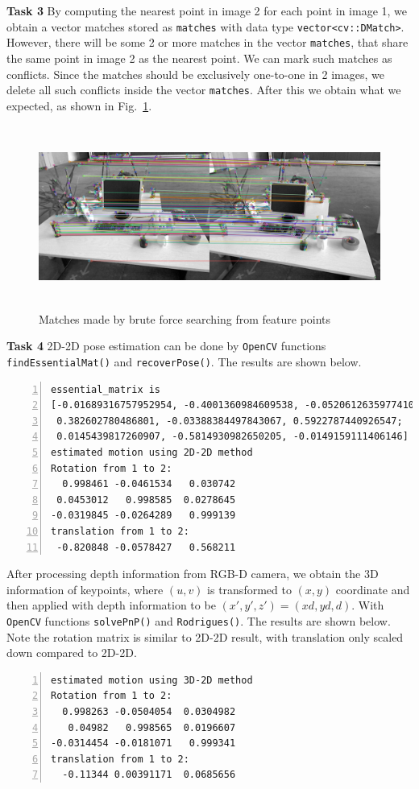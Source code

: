 \documentclass[12pt,a4paper]{article}
\begin{document}
    \textsf{\textbf{Task 3}}
    By computing the nearest point in image 2 for each point in image 1,
    we obtain a vector matches stored as \texttt{matches}
    with data type \texttt{vector<cv::DMatch>}.
    However, there will be some 2 or more matches in the vector \texttt{matches},
    that share the same point in image 2 as the nearest point.
    We can mark such matches as conflicts.
    Since the matches should be exclusively one-to-one in 2 images,
    we delete all such conflicts inside the vector \texttt{matches}.
    After this we obtain what we expected, as shown in Fig.~\ref{fig:matches}.
    
    \begin{figure}[!h]
        \centering
        \includegraphics[height=6cm]{fig/matches.png}
        \caption{Matches made by brute force searching from feature points}
        \label{fig:matches}
    \end{figure}

    \textsf{\textbf{Task 4}}
    2D-2D pose estimation can be done by \texttt{OpenCV} functions
    \texttt{findEssentialMat()} and \texttt{recoverPose()}.
    The results are shown below.
    \begin{lstlisting}[frame=single,numbers=left]
essential_matrix is 
[-0.01689316757952954, -0.4001360984609538, -0.05206126359774105;
 0.382602780486801, -0.03388384497843067, 0.5922787440926547;
 0.0145439817260907, -0.5814930982650205, -0.0149159111406146]
estimated motion using 2D-2D method
Rotation from 1 to 2: 
  0.998461 -0.0461534   0.030742
 0.0453012   0.998585  0.0278645
-0.0319845 -0.0264289   0.999139
translation from 1 to 2: 
 -0.820848 -0.0578427   0.568211
    \end{lstlisting}

    After processing depth information from RGB-D camera,
    we obtain the 3D information of keypoints,
    where $(u,v)$ is transformed to $(x,y)$ coordinate
    and then applied with depth information to be
    $(x',y',z') = (xd, yd, d)$.
    With \texttt{OpenCV} functions
    \texttt{solvePnP()} and \texttt{Rodrigues()}.
    The results are shown below.
    Note the rotation matrix is similar to 2D-2D result,
    with translation only scaled down compared to 2D-2D.
    \begin{lstlisting}[frame=single,numbers=left]
estimated motion using 3D-2D method
Rotation from 1 to 2: 
  0.998263 -0.0504054  0.0304982
   0.04982   0.998565  0.0196607
-0.0314454 -0.0181071   0.999341
translation from 1 to 2: 
  -0.11344 0.00391171  0.0685656
    \end{lstlisting}
\end{document}

